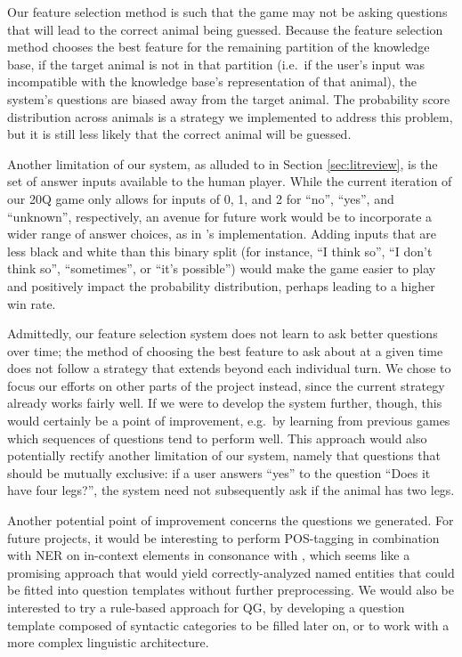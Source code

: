 \documentclass[11pt,a4paper]{article}
\begin{document}
Our feature selection method is such that the game may not be asking questions that will lead to the correct animal being guessed. 
Because the feature selection method chooses the best feature for the remaining partition of the knowledge base, if the target animal is not in that partition (i.e.\ if the user's input was incompatible with the knowledge base's representation of that animal), the system's questions are biased away from the target animal. 
The probability score distribution across animals is a strategy we implemented to address this problem, but it is still less likely that the correct animal will be guessed.

Another limitation of our system, as alluded to in Section \ref{sec:litreview}, is the set of answer inputs available to the human player. 
While the current iteration of our 20Q game only allows for inputs of 0, 1, and 2 for ``no'', ``yes'', and ``unknown'', respectively, an avenue for future work would be to incorporate a wider range of answer choices, as in \citet{Burgener2006}'s implementation. 
Adding inputs that are less black and white than this binary split (for instance, ``I think so'', ``I don't think so'', ``sometimes'', or ``it's possible'') would make the game easier to play and positively impact the probability distribution, perhaps leading to a higher win rate. 

Admittedly, our feature selection system does not learn to ask better questions over time; the method of choosing the best feature to ask about at a given time does not follow a strategy that extends beyond each individual turn. We chose to focus our efforts on other parts of the project instead, since the current strategy already works fairly well.
If we were to develop the system further, though, this would certainly be a point of improvement, e.g.\ by learning from previous games which sequences of questions tend to perform well.
This approach would also potentially rectify another limitation of our system, namely that questions that should be mutually exclusive: if a user answers ``yes'' to the question ``Does it have four legs?'', the system need not subsequently ask if the animal has two legs. 

Another potential point of improvement concerns the questions we generated.
For future projects, it would be interesting to perform POS-tagging in combination with NER on in-context elements in consonance with \citet{Mandasari2019}, which seems like a promising approach that would yield correctly-analyzed named entities that could be fitted into question templates without further preprocessing. 
We would also be interested to try a rule-based approach for QG, by developing a question template composed of syntactic categories to be filled later on, or to work with a more complex linguistic architecture. 
\end{document}
